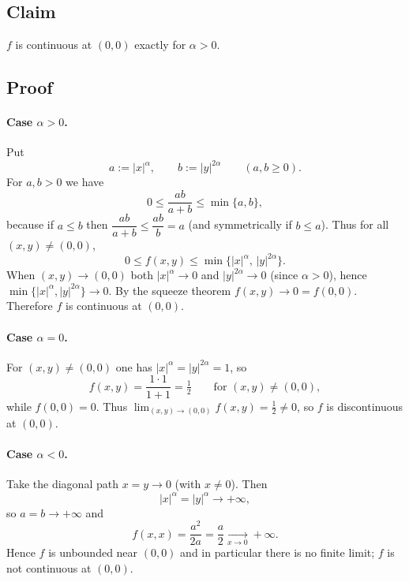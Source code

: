 \documentclass[12pt]{article}
\begin{document}
\begin{correctionbox}
\subsection*{Claim}
\(f\) is continuous at \((0,0)\) exactly for \(\alpha>0\).

\subsection*{Proof}

\paragraph{Case \(\alpha>0\).} Put
\[
a:=|x|^\alpha,\qquad b:=|y|^{2\alpha}\qquad(a,b\ge0).
\]
For \(a,b>0\) we have
\[
0\le \frac{ab}{a+b}\le \min\{a,b\},
\]
because if \(a\le b\) then \(\dfrac{ab}{a+b}\le \dfrac{ab}{b}=a\) (and symmetrically if \(b\le a\)). Thus for all \((x,y)\neq(0,0)\),
\[
0\le f(x,y)\le \min\{|x|^\alpha,\,|y|^{2\alpha}\}.
\]
When \((x,y)\to(0,0)\) both \(|x|^\alpha\to0\) and \(|y|^{2\alpha}\to0\) (since \(\alpha>0\)), hence \(\min\{|x|^\alpha,|y|^{2\alpha}\}\to0\). By the squeeze theorem \(f(x,y)\to0=f(0,0)\). Therefore \(f\) is continuous at \((0,0)\).

\paragraph{Case \(\alpha=0\).} For \((x,y)\neq(0,0)\) one has \(|x|^\alpha=|y|^{2\alpha}=1\), so
\[
f(x,y)=\frac{1\cdot1}{1+1}=\tfrac12\qquad\text{for }(x,y)\neq(0,0),
\]
while \(f(0,0)=0\). Thus \(\lim_{(x,y)\to(0,0)}f(x,y)=\tfrac12\neq0\), so \(f\) is discontinuous at \((0,0)\).

\paragraph{Case \(\alpha<0\).} Take the diagonal path \(x=y\to0\) (with \(x\neq0\)). Then
\[
|x|^\alpha=|y|^\alpha\to+\infty,
\]
so \(a=b\to+\infty\) and
\[
f(x,x)=\frac{a^2}{2a}=\frac{a}{2}\xrightarrow[x\to0]{}+\infty.
\]
Hence \(f\) is unbounded near \((0,0)\) and in particular there is no finite limit; \(f\) is not continuous at \((0,0)\).
\end{correctionbox}
\end{document}
